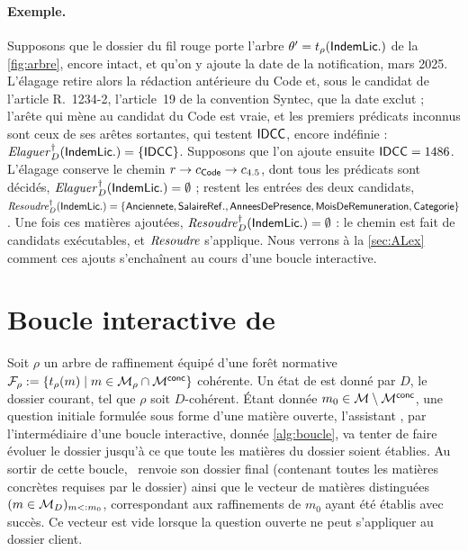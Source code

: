 \documentclass[review]{jflart}
\begin{document}
\paragraph{Exemple.}
Supposons que le dossier du fil rouge porte l'arbre \(\theta'=t_\rho(\mathsf{IndemLic.})\)
de la \autoref{fig:arbre}, encore intact, et qu'on y ajoute la date de la
notification, mars 2025. L'élagage retire alors la rédaction antérieure du
Code et, sous le candidat de l'article R.~1234-2, l'article~19 de la
convention Syntec, que la date exclut ; l'arête qui mène au candidat du Code
est vraie, et les premiers prédicats inconnus sont ceux de ses arêtes
sortantes, qui testent \(\mathsf{IDCC}\), encore indéfinie :
\(\mathit{Elaguer}^\dagger_D(\mathsf{IndemLic.})=\{\mathsf{IDCC}\}\). Supposons que l'on ajoute ensuite
\(\mathsf{IDCC}=1486\). L'élagage conserve le chemin \(r\to c_{\mathsf{Code}}\to c_{4.5}\),
dont tous les prédicats sont décidés, \(\mathit{Elaguer}^\dagger_D(\mathsf{IndemLic.})=\emptyset\) ;
restent les entrées des deux candidats,
\(\mathit{Resoudre}^\dagger_D(\mathsf{IndemLic.})=\{\mathsf{Anciennete},\mathsf{SalaireRef.},\mathsf{AnneesDePresence},\allowbreak\mathsf{MoisDeRemuneration},\mathsf{Categorie}\}\).
Une fois ces matières ajoutées, \(\mathit{Resoudre}^\dagger_D(\mathsf{IndemLic.})=\emptyset\) : le
chemin est fait de candidats exécutables, et \(\mathit{Resoudre}\) s'applique. Nous verrons à la \autoref{sec:ALex} comment
ces ajouts s'enchaînent au cours d'une boucle interactive.


\section{Boucle interactive de \ALex}\label{sec:ALex}

Soit $\rho$ un arbre de raffinement équipé d'une forêt normative
\(\mathcal{F}_\rho := \{t_\rho(m)\mid m\in\mathcal{M}_\rho\cap\mathcal{M}^{\mathsf{conc}}\}\) cohérente. Un état de \ALex{} est donné par $D$, le dossier courant, tel que $\rho$ soit $D$-cohérent. Étant donnée $m_0\in\mathcal{M}\setminus\mathcal{M}^{\mathsf{conc}}$, une question initiale formulée sous forme d'une matière ouverte, l'assistant \ALex, par l'intermédiaire d'une boucle interactive, donnée \autoref{alg:boucle}, va tenter de faire évoluer le dossier jusqu'à ce que toute les matières du dossier soient établies. Au sortir de cette boucle, \ALex~renvoie son dossier final (contenant toutes les matières concrètes requises par le dossier) ainsi que le vecteur de matières distinguées $(m\in\mathcal{M}_D)_{m<:m_0}$, correspondant aux raffinements de $m_0$ ayant été établis avec succès. Ce vecteur est vide lorsque la question ouverte ne peut s'appliquer au dossier client.
\end{document}
